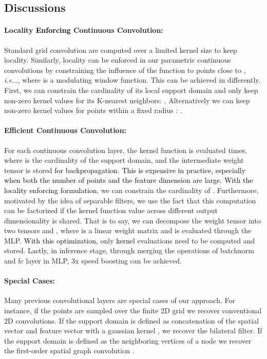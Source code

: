 \documentclass[10pt,twocolumn,letterpaper]{article}
\makeatletter
\newcommand\simon[1]{\textcolor{black}{#1}}
\def\@onedot{\ifx\@let@token.\else.\null\fi\xspace}
\DeclareRobustCommand\onedot{\futurelet\@let@token\@onedot}
\def\ie{\emph{i.e}\onedot} \def\Ie{\emph{I.e}\onedot}
\makeatother
\begin{document}
\subsection{Discussions}


\paragraph{Locality \simon{Enforcing} Continuous Convolution:} Standard grid convolution are computed over a limited kernel size  to keep locality. Similarly,  locality can be enforced in our parametric continuous convolutions by constraining the influence of the function  to points close to , \ie., 
where  is a modulating window function. 
This can be achieved in differently.
First, we can constrain the cardinality of its local support domain and only keep non-zero kernel values for its K-nearest neighbors: .
Alternatively we can keep non-zero kernel values for points within a fixed radius : . 

\paragraph{Efficient Continuous Convolution:} For each continuous convolution layer, the kernel function is evaluated  times, where  is the cardinality of the support domain, and the intermediate weight tensor is stored
\simon{for backpropagation}. \simon{This is expensive in practice, especially when both the number of points and the feature dimension are large.}  \simon{With the locality enforcing formulation}, we can constrain the cardinality of . Furthermore, motivated by the idea of separable filters, we use the fact that this computation can be factorized if the kernel function value across different output dimensionality is shared. That is to say, we can decompose the weight tensor  into 
two tensors  and  
, where  is a linear weight matrix and  is evaluated through the MLP. 
 \simon{With this optimization,} only   \simon{kernel} evaluations need to be computed and stored. Lastly, in inference stage, through merging the operations of batchnorm and fc layer in MLP, 3x speed boosting can be achieved. 

\paragraph{Special Cases:} Many previous convolutional layers are special cases of our approach. For instance, if the points are sampled over the finite 2D grid we recover conventional 2D convolutions. If the support domain is defined as concatenation of the spatial vector and feature vector with a gaussian kernel , we recover the bilateral filter. If the support domain is defined as the neighboring vertices of a node we recover the first-order spatial graph convolution \cite{gcn}.   
\end{document}
